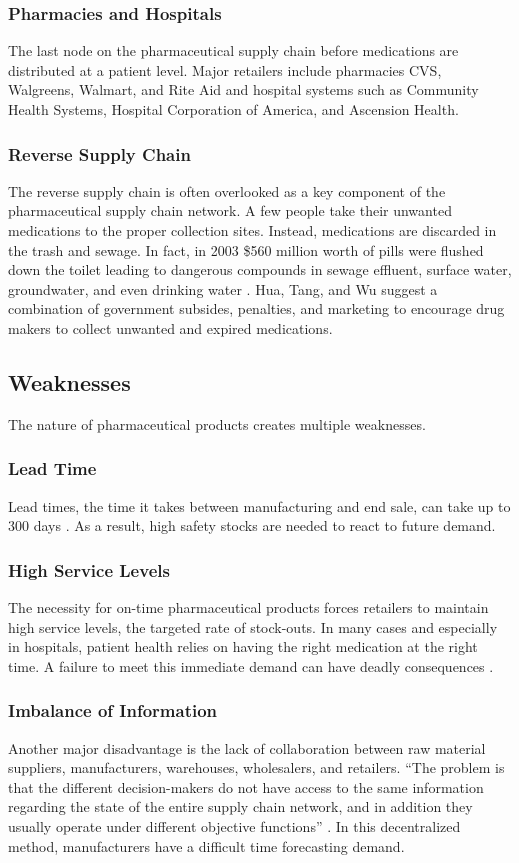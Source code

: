 \documentclass[sigconf]{acmart}
\begin{document}
\subsubsection{Pharmacies and Hospitals} The last node on the pharmaceutical supply chain before medications are distributed at a patient level. Major retailers include pharmacies CVS, Walgreens, Walmart, and Rite Aid and hospital systems such as Community Health Systems, Hospital Corporation of America, and Ascension Health. 
\subsubsection{Reverse Supply Chain} The reverse supply chain is often overlooked as a key component of the pharmaceutical supply chain network. A few people take their unwanted medications to the proper collection sites. Instead, medications are discarded in the trash and sewage. In fact, in 2003 \$560 million worth of pills were flushed down the toilet leading to dangerous compounds in sewage effluent, surface water, groundwater, and even drinking water \cite{Hua01}. Hua, Tang, and Wu \cite{Hua01} suggest a combination of government subsides, penalties, and marketing to encourage drug makers to collect unwanted and expired medications. 

\subsection{Weaknesses}
The nature of pharmaceutical products creates multiple weaknesses. 
\subsubsection{Lead Time} Lead times, the time it takes between manufacturing and end sale, can take up to 300 days \cite{Shah01}. As a result, high safety stocks are needed to react to future demand.
\subsubsection{High Service Levels} The necessity for on-time pharmaceutical products forces retailers to maintain high service levels, the targeted rate of stock-outs. In many cases and especially in hospitals, patient health relies on having the right medication at the right time. A failure to meet this immediate demand can have deadly consequences \cite{Kelle01}\cite{Hua01}.
\subsubsection{Imbalance of Information} Another major disadvantage is the lack of collaboration between raw material suppliers, manufacturers, warehouses, wholesalers, and retailers. ``The problem is that the different decision-makers do not have access to the same information regarding the state of the entire supply chain network, and in addition they usually operate under different objective functions'' \cite{Sahay01}. In this decentralized method, manufacturers have a difficult time forecasting demand. 
\end{document}
